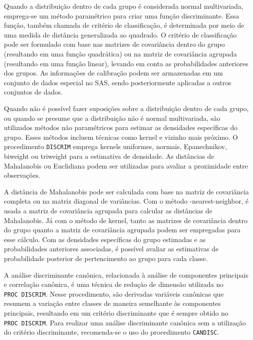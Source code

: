 \documentclass[
  a4paperpaper,
]{article}
\begin{document}
Quando a distribuição dentro de cada grupo é considerada normal
multivariada, emprega-se um método paramétrico para criar uma função
discriminante. Essa função, também chamada de critério de classificação,
é determinada por meio de uma medida de distância generalizada ao
quadrado. O critério de classificação pode ser formulado com base nas
matrizes de covariância dentro do grupo (resultando em uma função
quadrática) ou na matriz de covariância agrupada (resultando em uma
função linear), levando em conta as probabilidades anteriores dos
grupos. As informações de calibração podem ser armazenadas em um
conjunto de dados especial no SAS, sendo posteriormente aplicadas a
outros conjuntos de dados.

Quando não é possível fazer suposições sobre a distribuição dentro de
cada grupo, ou quando se presume que a distribuição não é normal
multivariada, são utilizados métodos não paramétricos para estimar as
densidades específicas do grupo. Esses métodos incluem técnicas como
kernel e vizinho mais próximo. O procedimento \texttt{DISCRIM} emprega
kernels uniformes, normais, Epanechnikov, biweight ou triweight para a
estimativa de densidade. As distâncias de Mahalanobis ou Euclidiana
podem ser utilizadas para avaliar a proximidade entre observações.

A distância de Mahalanobis pode ser calculada com base na matriz de
covariância completa ou na matriz diagonal de variâncias. Com o método
-nearest-neighbor, é usada a matriz de covariância agrupada para
calcular as distâncias de Mahalanobis. Já com o método de kernel, tanto
as matrizes de covariância dentro do grupo quanto a matriz de
covariância agrupada podem ser empregadas para esse cálculo. Com as
densidades específicas do grupo estimadas e as probabilidades anteriores
associadas, é possível avaliar as estimativas de probabilidade posterior
de pertencimento ao grupo para cada classe.

A análise discriminante canônica, relacionada à análise de componentes
principais e correlação canônica, é uma técnica de redução de dimensão
utilizada no \texttt{PROC\ DISCRIM}. Nesse procedimento, são derivadas
variáveis canônicas que resumem a variação entre classes de maneira
semelhante às componentes principais, resultando em um critério
discriminante que é sempre obtido no \texttt{PROC\ DISCRIM}. Para
realizar uma análise discriminante canônica sem a utilização do critério
discriminante, recomenda-se o uso do procedimento \texttt{CANDISC}.

\newpage{}
\end{document}
